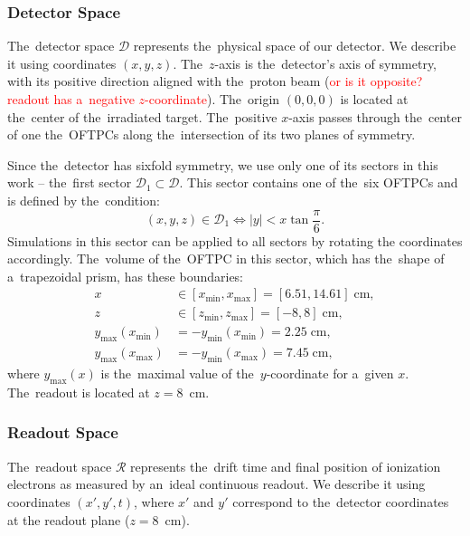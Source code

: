 			\subsubsection{Detector Space}
				The~detector space $\mathcal{D}$ represents the~physical space of our detector. We describe it using coordinates $(x,y,z)$. The~$z$-axis is the~detector's axis of symmetry, with its positive direction aligned with the~proton beam (\textcolor{red}{or is it opposite? readout has a~negative $z$-coordinate}). The~origin $(0,0,0)$ is located at the~center of the~irradiated target. The~positive $x$-axis passes through the~center of one the~\ac{OFTPC}s along the~intersection of its two planes of symmetry.
				
				Since the~detector has sixfold symmetry, we use only one of its sectors in this work -- the~first sector $\mathcal{D}_1 \subset \mathcal{D}$. This sector contains one of the~six \ac{OFTPC}s and is defined by the~condition:
					\begin{equation}
						(x,y,z) \in \mathcal{D}_1 \Leftrightarrow |y| < x\tan \frac{\pi}{6}.
					\end{equation}
				Simulations in this sector can be applied to all sectors by rotating the coordinates accordingly. The~volume of the~\ac{OFTPC} in this sector, which has the~shape of a~trapezoidal prism, has these boundaries:
					\begin{align}
						x &\in [x_\text{min},x_\text{max}] = [6.51, 14.61] \;\text{cm},\\
						z &\in [z_\text{min},z_\text{max}] = [-8,8] \;\text{cm},\\
						y_\text{max}(x_\text{min}) &= -y_\text{min}(x_\text{min}) =  2.25\;\text{cm},\\
						y_\text{max}(x_\text{max}) &= -y_\text{min}(x_\text{max}) =  7.45\;\text{cm},
					\end{align}
				where $y_\text{max}(x)$ is the~maximal value of the~$y$-coordinate for a~given $x$. The~readout is located at $z = 8$~cm.
			
			\subsubsection{Readout Space}
				The~readout space $\mathcal{R}$ represents the~drift time and final position of ionization electrons as measured by an~ideal continuous readout. We describe it using coordinates $(x',y',t)$, where $x'$ and $y'$ correspond to the~detector coordinates at the readout plane ($z = 8$~cm). 
			
